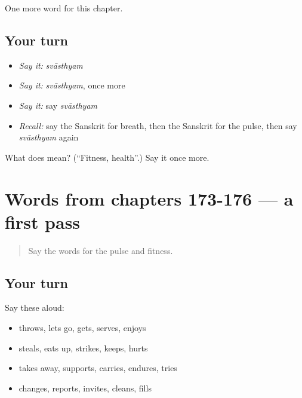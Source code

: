 \begin{grammarlens}[title={What you've built}]
One more word for this chapter.
\end{grammarlens}

\subsection*{Your turn}
\begin{itemize}
\raggedright
  \item \emph{Say it:} \emph{svāsthyam}
  \item \emph{Say it:} \emph{svāsthyam}, once more
  \item \emph{Say it:} say \emph{svāsthyam}
  \item \emph{Recall:} say the Sanskrit for breath, then the Sanskrit for the pulse, then say \emph{svāsthyam} again
\end{itemize}

\begin{tcolorbox}[breakable,colback=teal!4,colframe=teal!35!black,title={Before you move on}]
What does  mean? (\textquotedblleft{}Fitness, health\textquotedblright{}.) Say it once more.
\end{tcolorbox}
\section[(dialogue)]{Words from chapters 173-176 — a first pass}

\label{lesson:SA-R181-first-pass-words-from-chapters-173-176}



\begin{quote}
Say the words for the pulse and fitness.
\end{quote}

\subsection*{Your turn}
Say these aloud:

\begin{itemize}
\raggedright
  \item throws, lets go, gets, serves, enjoys
  \item steals, eats up, strikes, keeps, hurts
  \item takes away, supports, carries, endures, tries
  \item changes, reports, invites, cleans, fills
\end{itemize}

